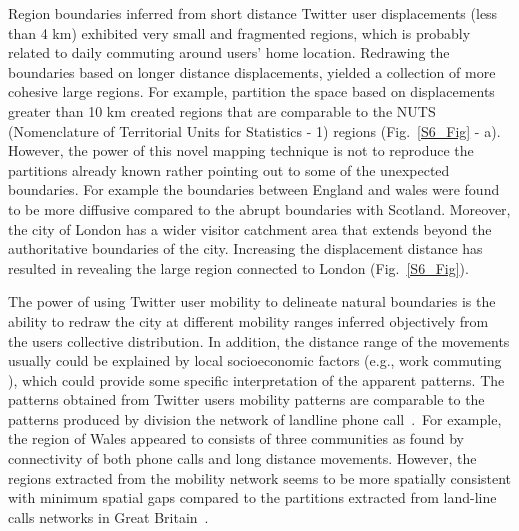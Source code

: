 \documentclass[10pt,letterpaper]{article}
\begin{document}
Region boundaries inferred from short distance Twitter user displacements (less than 4 km) exhibited very small and fragmented regions, which is probably related to daily commuting around users’ home location. 
Redrawing the boundaries based on longer distance displacements, yielded a collection of more cohesive large regions.
For example, partition the space based on displacements greater than 10 km created regions that are comparable to the NUTS (Nomenclature of Territorial Units for Statistics - 1) regions (Fig.~\ref{S6_Fig} - a). 
However, the power of this novel mapping technique is not to reproduce the partitions already known rather pointing out to some of the unexpected boundaries.
For example the boundaries between England and wales were found to be more diffusive compared to the abrupt boundaries with Scotland.
Moreover, the city of London has a wider visitor catchment area that extends beyond the authoritative boundaries of the city. 
Increasing the displacement distance has resulted in revealing the large region connected to London (Fig.~\ref{S6_Fig}). 

The power of using Twitter user mobility to delineate natural boundaries is the ability to redraw the city at different mobility ranges inferred objectively from the users collective distribution. 
In addition, the distance range of the movements usually could be explained by local socioeconomic factors (e.g., work commuting ), which could provide some specific interpretation of the apparent patterns.
The patterns obtained from Twitter users mobility patterns are comparable to the patterns produced by division the network of landline phone call~\cite{ratti2010}.\
For example, the region of Wales appeared to consists of three communities as found by connectivity of both phone calls and long distance movements. 
However, the regions extracted from the mobility network seems to be more spatially consistent with minimum spatial gaps compared to the partitions extracted from land-line calls networks in Great Britain~\cite{ratti2010}.
\end{document}
